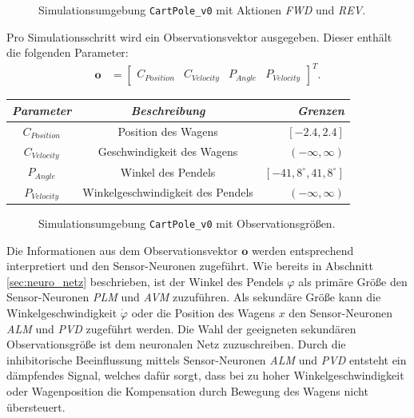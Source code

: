 	\begin{figure}[H] %
		\centering
		\def\svgwidth{12cm}
		
		\caption{Simulationsumgebung \texttt{CartPole\_v0} mit Aktionen \textit{FWD} und \textit{REV}.}
		\label{fig:imp_cartpole_FWD_REV}
	\end{figure}
	Pro Simulationsschritt wird ein Observationsvektor ausgegeben. Dieser enthält die folgenden Parameter:
	\begin{align}
		\boldsymbol{o} &= \begin{bmatrix}C_{Position} & C_{Velocity} & P_{Angle} & P_{Velocity}\end{bmatrix}^T\text{.}
	\end{align}
	\begin{center}
		\begin{tabular}{c@{\hskip 0.5cm}c@{\hskip 0.5cm}r@{\hskip 0.5cm}}    \toprule
			\setlength{\tabcolsep}{50pt}
			\renewcommand{\arraystretch}{1.5}
			\emph{Parameter}	& \emph{Beschreibung}  				& \emph{Grenzen} 			\\\midrule
			$C_{Position}$		& Position des Wagens				& $[-2.4, 2.4]$				\\
			$C_{Velocity}$		& Geschwindigkeit des Wagens		& $(-\infty, \infty)$		\\
			$P_{Angle}$			& Winkel des Pendels				& $[-41,8^{\circ}, 41,8^{\circ}]$	\\
			$P_{Velocity}$		& Winkelgeschwindigkeit des Pendels	& $(-\infty, \infty)$		\\\bottomrule
			\hline
		\end{tabular}
	\end{center}
	\begin{figure}[!h] %
		\centering
		\def\svgwidth{12cm}
		
		\caption{Simulationsumgebung \texttt{CartPole\_v0} mit Observationsgrößen.}
		\label{fig:imp_cartpole_observation}
	\end{figure}
	Die Informationen aus dem Observationsvektor $\boldsymbol{o}$ werden entsprechend interpretiert und den Sensor-Neuronen zugeführt. Wie bereits in Abschnitt \ref{sec:neuro_netz} beschrieben, ist der Winkel des Pendels $\varphi$ als primäre Größe den Sensor-Neuronen \textit{PLM} und \textit{AVM} zuzuführen. Als sekundäre Größe kann die Winkelgeschwindigkeit $\dot{\varphi}$ oder die Position des Wagens $x$ den Sensor-Neuronen \textit{ALM} und \textit{PVD} zugeführt werden. Die Wahl der geeigneten sekundären Observationsgröße ist dem neuronalen Netz zuzuschreiben. Durch die inhibitorische Beeinflussung mittels Sensor-Neuronen \textit{ALM} und \textit{PVD} entsteht ein dämpfendes Signal, welches dafür sorgt, dass bei zu hoher Winkelgeschwindigkeit oder Wagenposition die Kompensation durch Bewegung des Wagens nicht übersteuert.

